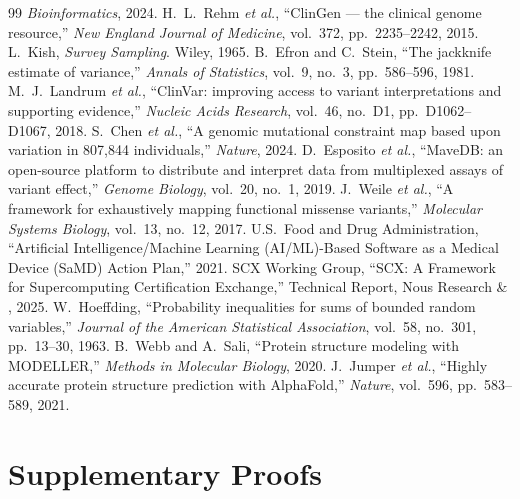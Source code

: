 \documentclass[11pt,a4paper]{article}
\theoremstyle{definition}
\newcommand{\SCX}{\textsc{SCX}}
\begin{document}
\begin{thebibliography}{99}
\textit{Bioinformatics}, 2024.
H.~L.~Rehm \textit{et al.},
``ClinGen — the clinical genome resource,''
\textit{New England Journal of Medicine}, vol.~372, pp.~2235--2242, 2015.
L.~Kish,
\textit{Survey Sampling}. Wiley, 1965.
B.~Efron and C.~Stein,
``The jackknife estimate of variance,''
\textit{Annals of Statistics}, vol.~9, no.~3, pp.~586--596, 1981.
M.~J.~Landrum \textit{et al.},
``ClinVar: improving access to variant interpretations and supporting evidence,''
\textit{Nucleic Acids Research}, vol.~46, no.~D1, pp.~D1062--D1067, 2018.
S.~Chen \textit{et al.},
``A genomic mutational constraint map based upon variation in 807,844 individuals,''
\textit{Nature}, 2024.
D.~Esposito \textit{et al.},
``MaveDB: an open-source platform to distribute and interpret data from multiplexed assays of variant effect,''
\textit{Genome Biology}, vol.~20, no.~1, 2019.
J.~Weile \textit{et al.},
``A framework for exhaustively mapping functional missense variants,''
\textit{Molecular Systems Biology}, vol.~13, no.~12, 2017.
U.S.~Food and Drug Administration,
``Artificial Intelligence/Machine Learning (AI/ML)-Based Software as a Medical Device (SaMD) Action Plan,''
2021.
\SCX{} Working Group,
``SCX: A Framework for Supercomputing Certification Exchange,''
Technical Report, Nous Research \& , 2025.
W.~Hoeffding,
``Probability inequalities for sums of bounded random variables,''
\textit{Journal of the American Statistical Association}, vol.~58, no.~301, pp.~13--30, 1963.
B.~Webb and A.~Sali,
``Protein structure modeling with MODELLER,''
\textit{Methods in Molecular Biology}, 2020.
J.~Jumper \textit{et al.},
``Highly accurate protein structure prediction with AlphaFold,''
\textit{Nature}, vol.~596, pp.~583--589, 2021.
\end{thebibliography}
\newpage
\appendix
\section{Supplementary Proofs}
\end{document}

